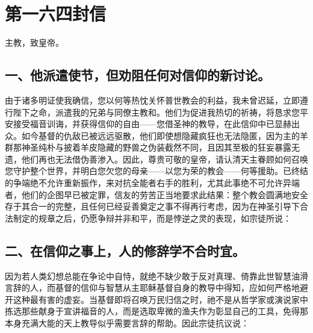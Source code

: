 
\section{第一六四封信}

主教，致皇帝。\par


\subsection{一、他派遣使节，但劝阻任何对信仰的新讨论。}

由于诸多明证使我确信，您以何等热忱关怀普世教会的利益，我未曾迟延，立即遵行陛下之命，派遣我的兄弟与同僚主教和。他们为促进我热切的祈祷，将恳求您平安接受福音训诲，并获得信仰的自由——您借圣神的教导，在此信仰中已显赫出众。如今基督的仇敌已被远远驱散，他们即使想隐藏疯狂也无法隐匿，因为主的羊群那神圣纯朴与披着羊皮隐藏的野兽之伪装截然不同，且因其至极的狂妄暴露无遗，他们再也无法借伪善渗入。因此，尊贵可敬的皇帝，请认清天主眷顾如何召唤您守护整个世界，并明白您欠您的母亲——以您为荣的教会——何等援助。已终结的争端绝不允许重新振作，来对抗全能者右手的胜利，尤其此事绝不可允许异端者，他们的企图早已被定罪，信友的劳苦正当地要求此结果：整个教会圆满地安全存于其合一的完整，且任何已经妥善奠定之事不得再行考虑，因为在神圣引导下合法制定的规章之后，仍愿争辩并非和平，而是悖逆之灵的表现，如宗徒所说：\par


\subsection{二、在信仰之事上，人的修辞学不合时宜。}

因为若人类幻想总能在争论中自恃，就绝不缺少敢于反对真理、倚靠此世智慧油滑言辞的人，而基督的信仰与智慧从主耶稣基督自身的教导中得知，应如何严格地避开这种最有害的虚妄。当基督即将召唤万民归信之时，祂不是从哲学家或演说家中拣选那些献身于宣讲福音的人，而是选取卑微的渔夫作为彰显自己的工具，免得那本身充满大能的天上教导似乎需要言辞的帮助。因此宗徒抗议说：\par

